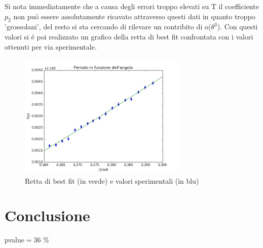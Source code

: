 \documentclass{article}
\begin{document}
Si nota immediatamente che a causa degli errori troppo elevati su T il coefficiente $p_2$ non pu\'o essere assolutamente ricavato attraverso questi dati in quanto troppo 'grossolani', del resto si sta cercando di rilevare un contribito di o($\theta^3$). 
Con questi valori si \'e poi realizzato un grafico della retta di best fit confrontata con i valori ottenuti per via sperimentale.


\begin{figure}[!htb]
\begin{center}
\includegraphics[width=8cm]{figura}
\end{center}
\caption{Retta di best fit (in verde) e valori sperimentali (in blu)}
\label{fig1}
\end{figure}




\section{Conclusione}
pvalue$=36$ \%
\end{document}
